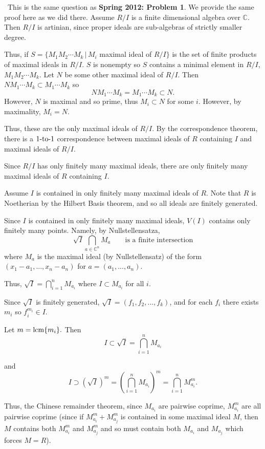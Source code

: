 \documentclass[12pt]{AlgebraQual}
\begin{document}
\begin{solution}$\,$
This is the same question as \textbf{Spring 2012: Problem 1}. We provide the same proof here as we did there.
\boxed{\implies} Assume $R/I$ is a finite dimensional algebra over $\mathbb{C}$. Then $R/I$ is artinian, since proper ideals are sub-algebras of strictly smaller degree.

Thus, if $S=\{M_1M_2\cdots M_k\,|\, M_i$ maximal ideal of $R/I\}$ is the set of finite products of maximal ideals in $R/I$. $S$ is nonempty so $S$ contains a minimal element in $R/I$, $M_1M_2\cdots M_k$. Let $N$ be some other maximal ideal of $R/I$. Then $NM_1\cdots M_k\subset M_1\cdots M_k$ so $$NM_1\cdots M_k= M_1\cdots M_k\subset N.$$ However, $N$ is maximal and so prime, thus $M_i\subset N$ for some $i$. However, by maximality, $M_i=N$.

Thus, these are the only maximal ideals of $R/I$. By the correspondence theorem, there is a $1\text{-to-}1$ correspondence between maximal ideals of $R$ containing $I$ and maximal ideals of $R/I$.

Since $R/I$ has only finitely many maximal ideals, there are only finitely many maximal ideals of $R$ containing $I.$

\boxed{\impliedby} Assume $I$ is contained in only finitely many maximal ideals of $R$. Note that $R$ is Noetherian by the Hilbert Basis theorem, and so all ideals are finitely generated.

Since $I$ is contained in only finitely many maximal ideals, $V(I)$ contains only finitely many points. Namely, by Nullstellensatza, $$\sqrt{I}\bigcap_{a\in\mathbb{C}^n}M_a\qquad \text{is a finite intersection}$$ where $M_a$ is the maximal ideal (by Nullstellensatz) of the form $(x_1-a_1,...,x_n-a_n)$ for $a=(a_1,...,a_n)$.

Thus, $\sqrt{I}=\bigcap_{i=1}^nM_{a_i}$ where $I\subset M_{a_i}$ for all $i$.

Since $\sqrt{I}$ is finitely generated, $\sqrt{I}=(f_1,f_2,...,f_k)$, and for each $f_i$ there exists $m_i$ so $f_i^{m_i}\in I$.

Let $m=\text{lcm}\{m_i\}.$ Then $$I\subset\sqrt{I}=\bigcap_{i=1}^nM_{a_i}$$

and $$I\supset (\sqrt{I})^m=\left(\bigcap_{i=1}^nM_{a_i}\right)^m=\bigcap_{i=1}^nM_{a_i}^m.$$

Thus, the Chinese remainder theorem, since $M_{a_i}$ are pairwise coprime, $M_{a_i}^m$ are all pairwise coprime (since if $M_{a_i}^m+M_{a_j}^m$ is contained in some maximal ideal $M$, then $M$ contains both $M_{a_i}^m$ and $M_{a_j}^m$ and so must contain both $M_{a_i}$ and $M_{a_j}$ which forces $M=R$).


\end{solution}
\end{document}
